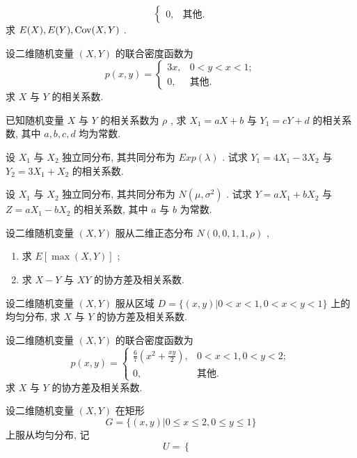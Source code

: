 \begin{xiti}
\begin{equation*}
\begin{cases}
						0, & \text{其他}.
					\end{cases}
				\end{equation*}
				求 $E(X),E(Y),\operatorname{Cov}(X,Y)$ .
			\item 设二维随机变量 $(X,Y)$ 的联合密度函数为
				\begin{equation*}
					p(x,y)=\begin{cases}
						3x, & 0<y<x<1;\\
						0, & \text{其他}.
					\end{cases}
				\end{equation*}
				求 $X$ 与 $Y$ 的相关系数.
			\item 已知随机变量 $X$ 与 $Y$ 的相关系数为 $\rho$ , 求 $X_1=aX+b$ 与 $Y_1=cY+d$ 的相关系数, 其中 $a,b,c,d$ 均为常数.
			\item 设 $X_1$ 与 $X_2$ 独立同分布, 其共同分布为 $Exp(\lambda)$ . 试求 $Y_1=4X_1-3X_2$ 与 $Y_2=3X_1+X_2$ 的相关系数.
			\item 设 $X_1$ 与 $X_2$ 独立同分布, 其共同分布为 $N\left(\mu,\sigma^2\right)$ . 试求 $Y=aX_1+bX_2$ 与 $Z=aX_1-bX_2$ 的相关系数, 其中 $a$ 与 $b$ 为常数.
			\item 设二维随机变量 $(X,Y)$ 服从二维正态分布 $N(0,0,1,1,\rho)$ ,
				\begin{enumerate}
					\item 求 $E[ \max(X,Y) ]$ ;
					\item 求 $X-Y$ 与 $XY$ 的协方差及相关系数.
				\end{enumerate}
			\item 设二维随机变量 $(X,Y)$ 服从区域 $D=\{ (x,y)|0<x<1,0<x<y<1 \}$ 上的均匀分布, 求 $X$ 与 $Y$ 的协方差及相关系数.
			\item 设二维随机变量 $(X,Y)$ 的联合密度函数为
				\begin{equation*}
					p(x,y)=\begin{cases}
						\frac{6}{7}\left( x^2+\frac{xy}{2} \right), & 0<x<1,0<y<2;\\
						0, & \text{其他}.
					\end{cases}
				\end{equation*}
				求 $X$ 与 $Y$ 的协方差及相关系数.
			\item 设二维随机变量 $(X,Y)$ 在矩形
				\begin{equation*}
					G=\{(x, y)| 0 \leqslant x \leqslant 2,0 \leqslant y \leqslant 1 \}
				\end{equation*}
				上服从均匀分布, 记
				\begin{equation*}
					U=\begin{cases}

\end{cases}
\end{equation*}
\end{xiti}
